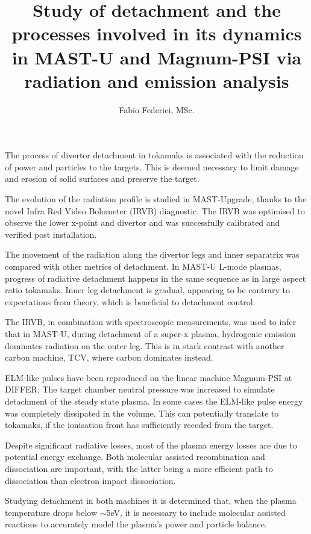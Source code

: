 \documentclass[]{yorkThesis}  %
\title{Study of detachment and the processes involved in its dynamics in MAST-U and Magnum-PSI via radiation and emission analysis}
\author{Fabio Federici, MSc.}
\begin{document}
\titlePage
\abstract
{}
The process of divertor detachment in tokamaks is associated with the reduction of power and particles to the targets. This is deemed necessary to limit damage and erosion of solid surfaces and preserve the target.

The evolution of the radiation profile is studied in MAST-Upgrade, thanks to the novel Infra Red Video Bolometer (IRVB) diagnostic. The IRVB was optimised to observe the lower x-point and divertor and was successfully calibrated and verified post installation.

The movement of the radiation along the divertor legs and inner separatrix was compared with other metrics of detachment. In MAST-U L-mode plasmas, progress of radiative detachment happens in the same sequence as in large aspect ratio tokamaks. Inner leg detachment is gradual, appearing to be contrary to expectations from theory, which is beneficial to detachment control.

The IRVB, in combination with spectroscopic measurements, was used to infer that in MAST-U, during detachment of a super-x plasma, hydrogenic emission dominates radiation on the outer leg. This is in stark contrast with another carbon machine, TCV, where carbon dominates instead.

ELM-like pulses have been reproduced on the linear machine Magnum-PSI at DIFFER. The target chamber neutral pressure was increased to simulate detachment of the steady state plasma. In some cases the ELM-like pulse energy was completely dissipated in the volume. This can potentially translate to tokamaks, if the ionisation front has sufficiently receded from the target.

Despite significant radiative losses, most of the plasma energy losses are due to potential energy exchange. Both molecular assisted recombination and dissociation are important, with the latter being a more efficient path to dissociation than electron impact dissociation.

Studying detachment in both machines it is determined that, when the plasma temperature drops below $\sim$5eV, it is necessary to include molecular assisted reactions to accurately model the plasma’s power and particle balance.

\contents
\end{document}
